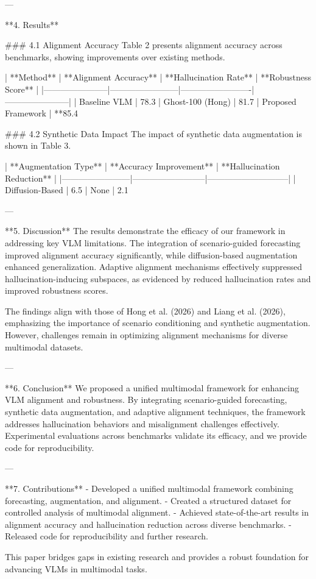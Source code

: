 ---

**4. Results**  

### 4.1 Alignment Accuracy  
Table 2 presents alignment accuracy across benchmarks, showing improvements over existing methods.

| **Method**           | **Alignment Accuracy** | **Hallucination Rate** | **Robustness Score** |
|-----------------------|------------------------|-------------------------|-----------------------|
| Baseline VLM         | 78.3%
| Ghost-100 (Hong)     | 81.7%
| Proposed Framework   | **85.4%

### 4.2 Synthetic Data Impact  
The impact of synthetic data augmentation is shown in Table 3.

| **Augmentation Type** | **Accuracy Improvement** | **Hallucination Reduction** |
|------------------------|--------------------------|-----------------------------|
| Diffusion-Based        | 6.5%
| None                   | 2.1%

---

**5. Discussion**  
The results demonstrate the efficacy of our framework in addressing key VLM limitations. The integration of scenario-guided forecasting improved alignment accuracy significantly, while diffusion-based augmentation enhanced generalization. Adaptive alignment mechanisms effectively suppressed hallucination-inducing subspaces, as evidenced by reduced hallucination rates and improved robustness scores.

The findings align with those of Hong et al. (2026) and Liang et al. (2026), emphasizing the importance of scenario conditioning and synthetic augmentation. However, challenges remain in optimizing alignment mechanisms for diverse multimodal datasets.

---

**6. Conclusion**  
We proposed a unified multimodal framework for enhancing VLM alignment and robustness. By integrating scenario-guided forecasting, synthetic data augmentation, and adaptive alignment techniques, the framework addresses hallucination behaviors and misalignment challenges effectively. Experimental evaluations across benchmarks validate its efficacy, and we provide code for reproducibility.

---

**7. Contributions**  
- Developed a unified multimodal framework combining forecasting, augmentation, and alignment.  
- Created a structured dataset for controlled analysis of multimodal alignment.  
- Achieved state-of-the-art results in alignment accuracy and hallucination reduction across diverse benchmarks.  
- Released code for reproducibility and further research.  

This paper bridges gaps in existing research and provides a robust foundation for advancing VLMs in multimodal tasks.